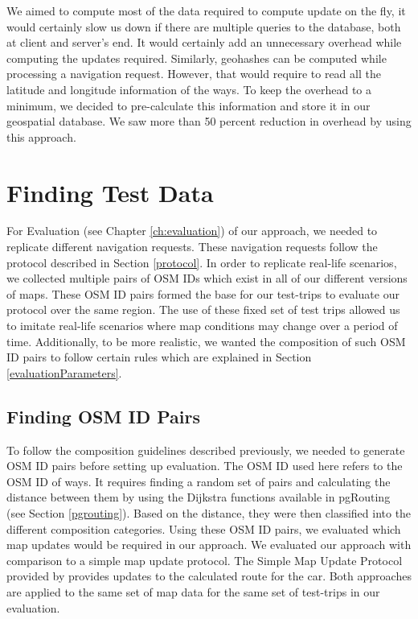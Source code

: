 We aimed to compute most of the data required to compute update on the fly, it would certainly slow us down if there are multiple queries to the database, both at client and server's end. It would certainly add an unnecessary overhead while computing the updates required. Similarly, geohashes can be computed while processing a navigation request. However, that would require to read all the latitude and longitude information of the ways. To keep the overhead to a minimum, we decided to pre-calculate this information and store it in our geospatial database. We saw more than 50 percent reduction in overhead by using this approach. 








\section{Finding Test Data}
For Evaluation (see Chapter \ref{ch:evaluation}) of our approach, we needed to replicate different navigation requests. These navigation requests follow the protocol described in Section \ref{protocol}. In order to replicate real-life scenarios, we collected multiple pairs of OSM IDs which exist in all of our different versions of maps. These OSM ID pairs formed the base for our test-trips to evaluate our protocol over the same region. The use of these fixed set of test trips allowed us to imitate real-life scenarios where map conditions may change over a period of time. Additionally, to be more realistic, we wanted the composition of such OSM ID pairs to follow certain rules which are explained in Section \ref{evaluationParameters}. 
\subsection{Finding OSM ID Pairs} \label{finding}
To follow the composition guidelines described previously, we needed to generate OSM ID pairs before setting up evaluation. The OSM ID used here refers to the OSM ID of ways. It requires finding a random set of pairs and calculating the distance between them by using the Dijkstra functions available in pgRouting (see Section \ref{pgrouting}). Based on the distance, they were then classified into the different composition categories. Using these OSM ID pairs, we evaluated which map updates would be required in our approach. We evaluated our approach with comparison to a simple map update protocol. The Simple Map Update Protocol provided by \citet{bastiaensen2003actmap} provides updates to the calculated route for the car. Both approaches are applied to the same set of map data for the same set of test-trips in our evaluation.  
